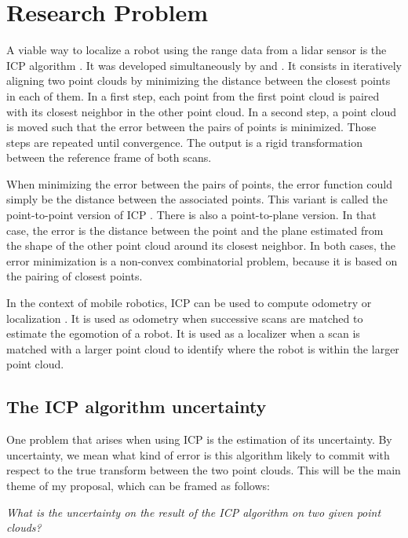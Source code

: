 \documentclass[10pt,letterpaper,oneside]{article}
\begin{document}
\section{Research Problem} \label{sec:problem}

A viable way to localize a robot using the range data from a lidar sensor is the \ac{ICP} algorithm \cite{Zhang1994}.
It was developed simultaneously by \citet{Chen1991} and \citet{Besl1992}.
It consists in iteratively aligning two point clouds by minimizing the distance between the closest points in each of them.
In a first step, each point from the first point cloud is paired with its closest neighbor in the other point cloud.
In a second step, a point cloud is moved such that the error between the pairs of points is minimized.
Those steps are repeated until convergence.
The output is a rigid transformation between the reference frame of both scans.

When minimizing the error between the pairs of points, the error function could simply be the distance between the associated points.
This variant is called the point-to-point version of ICP \cite[section 2.6.2]{Pomerleau2015}.
There is also a point-to-plane version.
In that case, the error is the distance between the point and the plane estimated from the shape of the other point cloud around its closest neighbor.
In both cases, the error minimization is a non-convex combinatorial problem, because it is based on the pairing of closest points.

In the context of mobile robotics, \ac{ICP} can be used to compute odometry or localization \cite{Censi2007}.
It is used as odometry when successive scans are matched to estimate the egomotion of a robot.
It is used as a localizer when a scan is matched with a larger point cloud to identify where the robot is within the larger point cloud.

\subsection{The \acl{ICP} algorithm uncertainty} 

One problem that arises when using \ac{ICP} is the estimation of its uncertainty.
By uncertainty, we mean what kind of error is this algorithm likely to commit with respect to the true transform between the two point clouds.
This will be the main theme of my proposal, which can be framed as follows:

\begin{center}
\emph{What is the uncertainty on the result of the \ac{ICP} algorithm on two given point clouds?}
\end{center}
\end{document}
